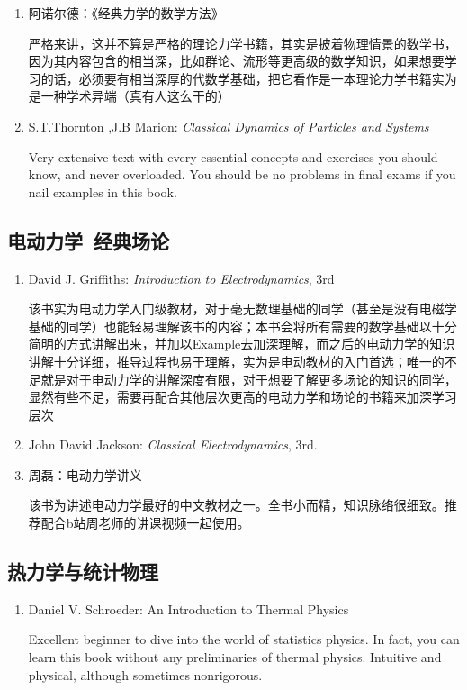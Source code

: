 \begin{enumerate}
  \item 阿诺尔德：《经典力学的数学方法》

  严格来讲，这并不算是严格的理论力学书籍，其实是披着物理情景的数学书，因为其内容包含的相当深，比如群论、流形等更高级的数学知识，如果想要学习的话，必须要有相当深厚的代数学基础，把它看作是一本理论力学书籍实为是一种学术异端（真有人这么干的）

  \item S.T.Thornton ,J.B Marion: \textit{Classical Dynamics of Particles and Systems}

  Very extensive text with every essential concepts and exercises you should know, and never overloaded.
  You should be no problems in final exams if you nail examples in this book.
\end{enumerate}

\subsection*{电动力学\ 经典场论 }
\begin{enumerate}
  \item David J. Griffiths: \textit{Introduction to Electrodynamics}, 3rd

  该书实为电动力学入门级教材，对于毫无数理基础的同学（甚至是没有电磁学基础的同学）也能轻易理解该书的内容；本书会将所有需要的数学基础以十分简明的方式讲解出来，并加以Example去加深理解，而之后的电动力学的知识讲解十分详细，推导过程也易于理解，实为是电动教材的入门首选；唯一的不足就是对于电动力学的讲解深度有限，对于想要了解更多场论的知识的同学，显然有些不足，需要再配合其他层次更高的电动力学和场论的书籍来加深学习层次

  \item John David Jackson: \textit{Classical Electrodynamics}, 3rd.
  \item 周磊：电动力学讲义

  该书为讲述电动力学最好的中文教材之一。全书小而精，知识脉络很细致。推荐配合b站周老师的讲课视频一起使用。
\end{enumerate}


\subsection*{热力学与统计物理}

\begin{enumerate}
  \item Daniel V. Schroeder: An Introduction to Thermal Physics

  Excellent beginner to dive into the world of statistics physics. In fact, you can learn this book without any preliminaries of thermal physics. Intuitive and physical, although sometimes nonrigorous.
\end{enumerate}


